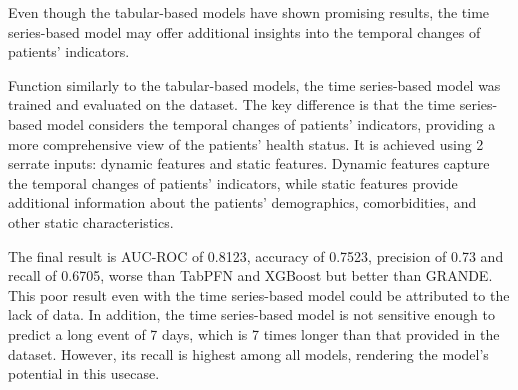 \documentclass[../main.tex]{subfiles}
\begin{document}
Even though the tabular-based models have shown promising results, the time series-based model may offer additional insights into the temporal changes of patients' indicators.

Function similarly to the tabular-based models, the time series-based model was trained and evaluated on the dataset.
The key difference is that the time series-based model considers the temporal changes of patients' indicators, providing a more comprehensive view of the patients' health status.
It is achieved using 2 serrate inputs: dynamic features and static features.
Dynamic features capture the temporal changes of patients' indicators, while static features provide additional information about the patients' demographics, comorbidities, and other static characteristics.

The final result is AUC-ROC of 0.8123, accuracy of 0.7523, precision of 0.73 and recall of 0.6705, worse than TabPFN and XGBoost but better than GRANDE.
This poor result even with the time series-based model could be attributed to the lack of data.
In addition, the time series-based model is not sensitive enough to predict a long event of 7 days, which is 7 times longer than that provided in the dataset.
However, its recall is highest among all models, rendering the model's potential in this usecase.
\end{document}
